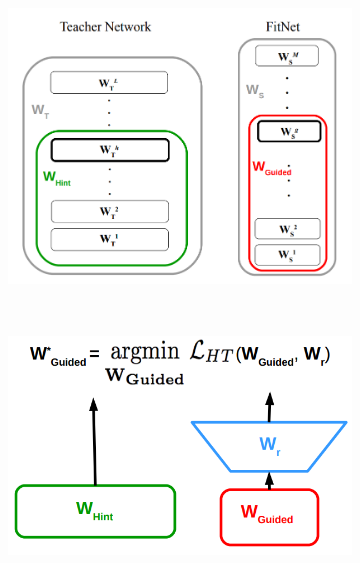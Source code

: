 \documentclass{kththesis}
\begin{document}
\begin{figure}[h]
    \centering
    \begin{subfigure}[b]{0.3\textwidth}
        \includegraphics[width=\textwidth]{FitNet_A}
    \end{subfigure}
    ~ %
    \begin{subfigure}[b]{0.3\textwidth}
        \includegraphics[width=\textwidth]{FitNet_B}
      \end{subfigure}
    ~

\end{figure}
\end{document}
